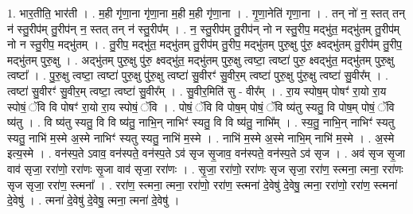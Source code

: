 \documentclass[17pt]{extarticle}
\begin{document}
1. भार॒तीति॒ भार॑ती । . म॒ही गृ॑णा॒ना गृ॑णा॒ना म॒ही म॒ही गृ॑णा॒ना । . गृ॒णा॒नेति॑ गृणा॒ना । . तन् नो॑ न॒ स्तत् तन् न॑ स्तु॒रीप॑म् तु॒रीप॑न् न॒ स्तत् तन् न॑ स्तु॒रीप᳚म् । . न॒ स्तु॒रीप॑म् तु॒रीप॑न् नो न स्तु॒रीप॒ मद्भु॑त॒ मद्भु॑तम् तु॒रीप॑म् नो न स्तु॒रीप॒ मद्भु॑तम् । . तु॒रीप॒ मद्भु॑त॒ मद्भु॑तम् तु॒रीप॑म् तु॒रीप॒ मद्भु॑तम् पुरु॒क्षु पु॑रु॒ क्ष्वद्भु॑तम् तु॒रीप॑म् तु॒रीप॒ मद्भु॑तम् पुरु॒क्षु । . अद्भु॑तम् पुरु॒क्षु पु॑रु॒ क्ष्वद्भु॑त॒ मद्भु॑तम् पुरु॒क्षु त्वष्टा॒ त्वष्टा॑ पुरु॒ क्ष्वद्भु॑त॒ मद्भु॑तम् पुरु॒क्षु त्वष्टा᳚ । . पु॒रु॒क्षु त्वष्टा॒ त्वष्टा॑ पुरु॒क्षु पु॑रु॒क्षु त्वष्टा॑ सु॒वीरꣳ॑ सु॒वीर॒म् त्वष्टा॑ पुरु॒क्षु पु॑रु॒क्षु त्वष्टा॑ सु॒वीर᳚म् । . त्वष्टा॑ सु॒वीरꣳ॑ सु॒वीर॒म् त्वष्टा॒ त्वष्टा॑ सु॒वीर᳚म् । . सु॒वीर॒मिति॑ सु - वीर᳚म् । . रा॒य स्पोष॒म् पोषꣳ॑ रा॒यो रा॒य स्पोषं॒ ॅवि वि पोषꣳ॑ रा॒यो रा॒य स्पोषं॒ ॅवि । . पोषं॒ ॅवि वि पोष॒म् पोषं॒ ॅवि ष्य॑तु स्यतु॒ वि पोष॒म् पोषं॒ ॅवि ष्य॑तु । . वि ष्य॑तु स्यतु॒ वि वि ष्य॑तु॒ नाभि॒न् नाभिꣳ॑ स्यतु॒ वि वि ष्य॑तु॒ नाभि᳚म् । . स्य॒तु॒ नाभि॒न् नाभिꣳ॑ स्यतु स्यतु॒ नाभि॑ म॒स्मे अ॒स्मे नाभिꣳ॑ स्यतु स्यतु॒ नाभि॑ म॒स्मे । . नाभि॑ म॒स्मे अ॒स्मे नाभि॒म् नाभि॑ म॒स्मे । . अ॒स्मे इत्य॒स्मे । . वन॑स्प॒ते ऽवाव॒ वन॑स्पते॒ वन॑स्प॒ते ऽव॑ सृज सृ॒जाव॒ वन॑स्पते॒ वन॑स्प॒ते ऽव॑ सृज । . अव॑ सृज सृ॒जा वाव॑ सृजा॒ ररा॑णो॒ ररा॑णः सृ॒जा वाव॑ सृजा॒ ररा॑णः । . सृ॒जा॒ ररा॑णो॒ ररा॑णः सृज सृजा॒ ररा॑ण॒ स्त्मना॒ त्मना॒ ररा॑णः सृज सृजा॒ ररा॑ण॒ स्त्मना᳚ । . ररा॑ण॒ स्त्मना॒ त्मना॒ ररा॑णो॒ ररा॑ण॒ स्त्मना॑ दे॒वेषु॑ दे॒वेषु॒ त्मना॒ ररा॑णो॒ ररा॑ण॒ स्त्मना॑ दे॒वेषु॑ । . त्मना॑ दे॒वेषु॑ दे॒वेषु॒ त्मना॒ त्मना॑ दे॒वेषु॑ । \newline
\end{document}
